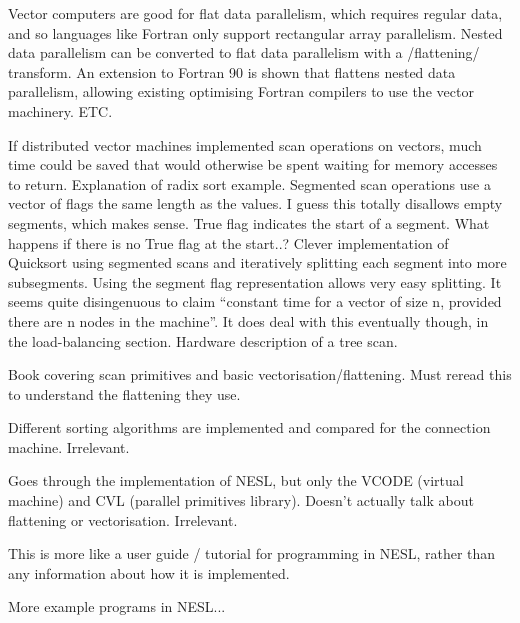 Vector computers are good for flat data parallelism, which requires regular data, and so languages like Fortran only support rectangular array parallelism. Nested data parallelism can be converted to flat data parallelism with a /flattening/ transform. An extension to Fortran 90 is shown that flattens nested data parallelism, allowing existing optimising Fortran compilers to use the vector machinery.
ETC.

If distributed vector machines implemented scan operations on vectors, much time could be saved that would otherwise be spent waiting for memory accesses to return.
Explanation of radix sort example.
Segmented scan operations use a vector of flags the same length as the values. I guess this totally disallows empty segments, which makes sense. True flag indicates the start of a segment. What happens if there is no True flag at the start..?
Clever implementation of Quicksort using segmented scans and iteratively splitting each segment into more subsegments. Using the segment flag representation allows very easy splitting.
It seems quite disingenuous to claim ``constant time for a vector of size n, provided there are n nodes in the machine''. It does deal with this eventually though, in the load-balancing section.
Hardware description of a tree scan.

Book covering scan primitives and basic vectorisation/flattening.
Must reread this to understand the flattening they use.

Different sorting algorithms are implemented and compared for the connection machine. Irrelevant.

Goes through the implementation of NESL, but only the VCODE (virtual machine) and CVL (parallel primitives library).
Doesn't actually talk about flattening or vectorisation.
Irrelevant.

This is more like a user guide / tutorial for programming in NESL, rather than any information about how it is implemented.

More example programs in NESL...



